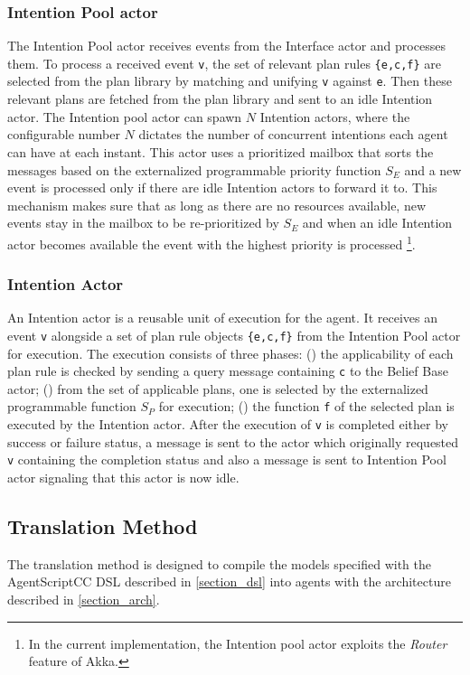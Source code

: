 \subsubsection{Intention Pool actor}
The Intention Pool actor receives events from the Interface actor and processes them. To process a received event \verb+v+, the set of relevant plan rules \verb+{e,c,f}+ are selected from the plan library by matching and unifying \verb+v+ against \verb+e+. Then these relevant plans are fetched from the plan library and sent to an idle Intention actor. The Intention pool actor can spawn $N$ Intention actors, where the configurable number $N$ dictates the number of concurrent intentions each agent can have at each instant. This actor uses a prioritized mailbox that sorts the messages based on the externalized programmable priority function $S_E$ and a new event is processed only if there are idle Intention actors to forward it to. This mechanism makes sure that as long as there are no resources available, new events stay in the mailbox to be re-prioritized by $S_E$ and when an idle Intention actor becomes available the event with the highest priority is processed \footnote{In the current implementation, the Intention pool actor exploits the \textit{Router} feature of Akka.}. %

\subsubsection{Intention Actor}
An Intention actor is a reusable unit of execution for the agent. It receives an event \verb+v+ alongside a set of plan rule objects \verb+{e,c,f}+ from the Intention Pool actor for execution. The execution consists of three phases: () the applicability of each plan rule is checked by sending a query message containing \verb+c+ to the Belief Base actor; () from the set of applicable plans, one is selected by the externalized programmable function $S_P$ for execution; () the function  \verb+f+ of the selected plan is executed by the Intention actor. After the execution of \verb+v+ is completed either by success or failure status, a message is sent to the actor which originally requested \verb+v+ containing the completion status and also a message is sent to Intention Pool actor signaling that this actor is now idle.


\subsection{Translation Method}
The translation method is designed to compile the models specified with the AgentScriptCC DSL described in \ref{section_dsl} into agents with the architecture described in \ref{section_arch}. 

